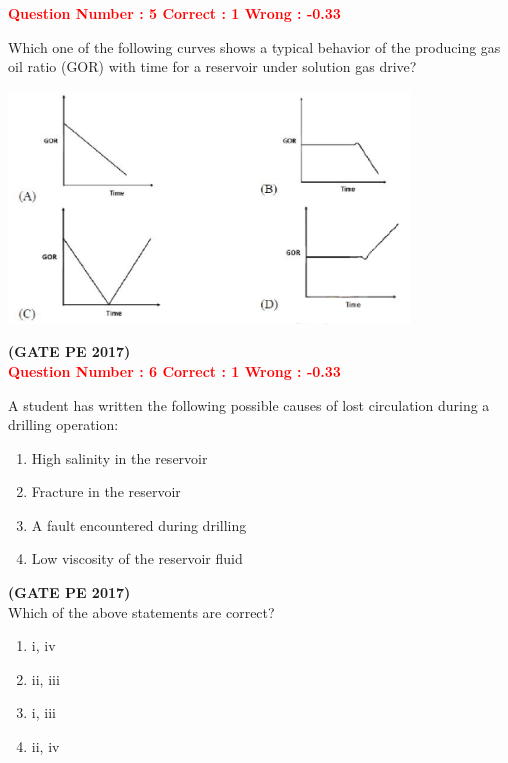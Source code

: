 \documentclass[12pt]{article}
\begin{document}
{\textcolor{red}{\textbf{Question Number : 5 \hfill Correct : 1  Wrong : -0.33}}

Which one of the following curves shows a typical behavior of the producing gas oil ratio (GOR) with time for a reservoir under solution gas drive?

\begin{center}
    \includegraphics[width=0.8\textwidth]{Figs/GraphQ _5.png} 
\end{center}

\hfill\textbf{(GATE PE 2017)}\\[0.6cm]


\textcolor{red}{\textbf{Question Number : 6 \hfill Correct : 1  Wrong : -0.33}}

A student has written the following possible causes of lost circulation during a drilling operation:
\begin{enumerate}[label=\roman*.]
    \item High salinity in the reservoir \\
    \item Fracture in the reservoir \\
    \item A fault encountered during drilling \\
    \item Low viscosity of the reservoir fluid
\end{enumerate}
\hfill\textbf{(GATE PE 2017)}\\[0.6cm]

Which of the above statements are correct?

\begin{enumerate}[label=(\Alph*)]
    \item i, iv
    \item ii, iii
    \item i, iii
    \item ii, iv
\end{enumerate}

}
\end{document}
